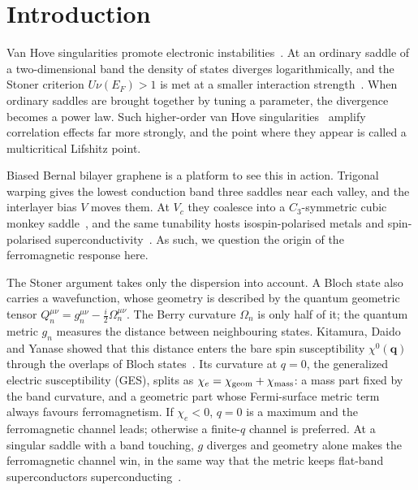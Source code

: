 \documentclass[12pt,a4paper]{article}
\newcommand{\bq}{\mathbf{q}}
\newcommand{\chie}{\chi_{e}}
\newcommand{\chig}{\chi_{\rm geom}}
\newcommand{\chim}{\chi_{\rm mass}}
\begin{document}
\clearpage
{}

\section{Introduction}\label{sec:intro}

Van Hove singularities promote electronic instabilities~\citep{VanHove1953}. At an ordinary saddle of a two-dimensional band the density of states diverges logarithmically, and the Stoner criterion $U\nu(E_F)>1$ is met at a smaller interaction strength~\citep{Stoner1938}. When ordinary saddles are brought together by tuning a parameter, the divergence becomes a power law. Such higher-order van Hove singularities~\citep{Shtyk2017,Yuan2019} amplify correlation effects far more strongly, and the point where they appear is called a multicritical Lifshitz point.

Biased Bernal bilayer graphene is a platform to see this in action. Trigonal warping gives the lowest conduction band three saddles near each valley, and the interlayer bias $V$ moves them. At $V_c$ they coalesce into a $C_3$-symmetric cubic monkey saddle~\citep{Shtyk2017}, and the same tunability hosts isospin-polarised metals and spin-polarised superconductivity~\citep{Zhou2022,Seiler2022,delaBarrera2022}. As such, we question the origin of the ferromagnetic response here.

The Stoner argument takes only the dispersion into account. A Bloch state also carries a wavefunction, whose geometry is described by the quantum geometric tensor $Q_n^{\mu\nu}=g_n^{\mu\nu}-\tfrac{i}{2}\Omega_n^{\mu\nu}$. The Berry curvature $\Omega_n$ is only half of it; the quantum metric $g_n$ measures the distance between neighbouring states. Kitamura, Daido and Yanase showed that this distance enters the bare spin susceptibility $\chi^0(\bq)$ through the overlaps of Bloch states~\citep{Kitamura2024}. Its curvature at $q=0$, the generalized electric susceptibility (GES), splits as $\chie=\chig+\chim$: a mass part fixed by the band curvature, and a geometric part whose Fermi-surface metric term always favours ferromagnetism. If $\chie<0$, $q=0$ is a maximum and the ferromagnetic channel leads; otherwise a finite-$q$ channel is preferred. At a singular saddle with a band touching, $g$ diverges and geometry alone makes the ferromagnetic channel win, in the same way that the metric keeps flat-band superconductors superconducting~\citep{Peotta2015,Torma2022}.
\end{document}
